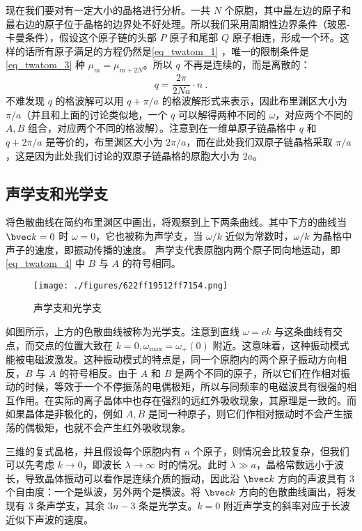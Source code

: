 现在我们要对有一定大小的晶格进行分析。一共 $N$ 个原胞，其中最左边的原子和最右边的原子位于晶格的边界处不好处理。所以我们采用周期性边界条件（玻恩-卡曼条件），假设这个原子链的头部 $P$ 原子和尾部 $Q$ 原子相连，形成一个环。这样的话所有原子满足的方程仍然是\autoref{eq_twatom_1} ，唯一的限制条件是 \autoref{eq_twatom_3} 种 $\mu_{m}=\mu_{m+2N}$。所以 $q$ 不再是连续的，而是离散的：
\begin{equation}
q=\frac{2\pi}{2Na} \cdot n~.
\end{equation}
不难发现 $q$ 的格波解可以用 $q+\pi/a$ 的格波解形式来表示，因此布里渊区大小为 $\pi/a$（并且和上面的讨论类似地，一个 $q$ 可以解得两种不同的 $\omega$，对应两个不同的 $A,B$ 组合，对应两个不同的格波解）。注意到在一维单原子链晶格中 $q$ 和 $q+2\pi/a$ 是等价的，布里渊区大小为 $2\pi/a$，而在此处我们双原子链晶格采取 $\pi/a$ ，这是因为此处我们讨论的双原子链晶格的原胞大小为 $2a$。

\subsection{声学支和光学支}
将色散曲线在简约布里渊区中画出，将观察到上下两条曲线。其中下方的曲线当 $\bvec k=0$ 时 $\omega=0$，它也被称为声学支，当 $\omega/k$ 近似为常数时，$\omega/k$ 为晶格中声子的速度，即振动传播的速度。 
声学支代表原胞内两个原子同向地运动，即\autoref{eq_twatom_4} 中 $B$ 与 $A$ 的符号相同。
\begin{figure}[ht]
\centering
\texttt{[image: ./figures/622ff19512ff7154.png]}
\caption{声学支和光学支} \label{fig_twatom_2}
\end{figure}
如图所示，上方的色散曲线被称为光学支。注意到直线 $\omega=ck$ 与这条曲线有交点，而交点的位置大致在 $k=0,\omega_{\max}=\omega_+(0)$ 附近。这意味着，这种振动模式能被电磁波激发。这种振动模式的特点是，同一个原胞内的两个原子振动方向相反，$B$ 与 $A$ 的符号相反。由于 $A$ 和 $B$ 是两个不同的原子，所以它们在作相对振动的时候，等效于一个不停振荡的电偶极矩，所以与同频率的电磁波具有很强的相互作用。在实际的离子晶体中也存在强烈的远红外吸收现象，其原理是一致的。而如果晶体是非极化的，例如 $A,B$ 是同一种原子，则它们作相对振动时不会产生振荡的偶极矩，也就不会产生红外吸收现象。

三维的复式晶格，并且假设每个原胞内有 $n$ 个原子，则情况会比较复杂，但我们可以先考虑 $k\rightarrow 0$，即波长 $\lambda\rightarrow \infty$ 时的情况。此时 $\lambda\gg a$，晶格常数远小于波长，导致晶体振动可以看作是连续介质的振动，因此沿 $\bvec k$ 方向的声波具有 $3$ 个自由度：一个是纵波，另外两个是横波。将 $\bvec k$ 方向的色散曲线画出，将发现有 $3$ 条声学支，其余 $3n-3$ 条是光学支。$k=0$ 附近声学支的斜率对应于长波近似下声波的速度。
